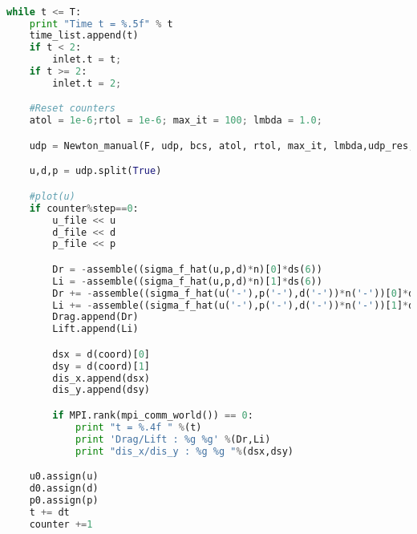 \begin{lstlisting}[language=Python]

while t <= T:
    print "Time t = %.5f" % t
    time_list.append(t)
    if t < 2:
        inlet.t = t;
    if t >= 2:
        inlet.t = 2;

    #Reset counters
    atol = 1e-6;rtol = 1e-6; max_it = 100; lmbda = 1.0;

    udp = Newton_manual(F, udp, bcs, atol, rtol, max_it, lmbda,udp_res,VVQ)

    u,d,p = udp.split(True)

    #plot(u)
    if counter%step==0:
        u_file << u
        d_file << d
        p_file << p

        Dr = -assemble((sigma_f_hat(u,p,d)*n)[0]*ds(6))
        Li = -assemble((sigma_f_hat(u,p,d)*n)[1]*ds(6))
        Dr += -assemble((sigma_f_hat(u('-'),p('-'),d('-'))*n('-'))[0]*dS(5))
        Li += -assemble((sigma_f_hat(u('-'),p('-'),d('-'))*n('-'))[1]*dS(5))
        Drag.append(Dr)
        Lift.append(Li)

        dsx = d(coord)[0]
        dsy = d(coord)[1]
        dis_x.append(dsx)
        dis_y.append(dsy)

        if MPI.rank(mpi_comm_world()) == 0:
            print "t = %.4f " %(t)
            print 'Drag/Lift : %g %g' %(Dr,Li)
            print "dis_x/dis_y : %g %g "%(dsx,dsy)

    u0.assign(u)
    d0.assign(d)
    p0.assign(p)
    t += dt
    counter +=1
\end{lstlisting}


	









